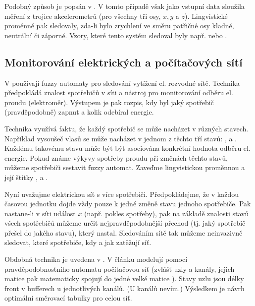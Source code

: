 \documentclass[a4paper,10pt]{article}
\begin{document}
Podobný způsob je popsán v \cite{Hul+-ManRecUsProFinStaMacFuzLog}. V tomto případě však jako vstupní data sloužila měření z trojice akcelerometrů (pro všechny tři osy, $x, y$ a $z$). Lingvistické proměnné pak sledovaly, zda-li bylo zrychlení ve směru patřičné osy kladné, neutrální či záporné. Vzory, které tento systém sledoval byly např.  nebo .


\subsection{Monitorování elektrických a počítačových sítí} \label{subs:MonElComNet}
V \cite{DucMarMar-AlgBasFiStMacFuzTrNoIntrLoaDis} používají fuzzy automaty pro sledování vytížení el. rozvodné sítě. Technika předpokládá znalost spotřebičů v síti a nástroj pro monitorování odběru el. proudu (elektroměr). Výstupem je pak rozpis, kdy byl jaký spotřebič (pravděpodobně) zapnut a kolik odebíral energie.

Technika využívá faktu, že každý spotřebič se může nacházet v různých stavech. Například vysoušeč vlasů se může nacházet v jednom z těchto tří stavů: ,  a . Každému takovému stavu může být být asociována konkrétní hodnota odběru el. energie.  Pokud známe výkyvy spotřeby proudu při změnách těchto stavů, můžeme spotřebiči sestavit fuzzy automat. Zaveďme lingvistickou proměnnou  a její štítky ,  a . 

Nyní uvažujme elektrickou síť s více spotřebiči. Předpokládejme, že v každou časovou jednotku dojde vždy pouze k jedné změně stavu jednoho spotřebiče. Pak nastane-li v síti událost $x$ (např. pokles spotřeby), pak na základě znalosti stavů všech spotřebičů můžeme určit nejpravděpodobnější přechod (tj. jaký spotřebič přešel do jakého stavu), který nastal. Sledováním sítě tak můžeme neinvazivně sledovat, které spotřebiče, kdy a jak zatěžují síť.


Obdobná technika je uvedena v \cite{Niz-ModComComNetViaPrAu}. V článku modelují pomocí pravděpodobnostního automatu počítačovou síť (zvlášť uzly a kanály, jejich matice pak matematicky spojují do jedné velké matice ). Stavy uzlu jsou délky front v bufferech u jednotlivých kanálů. (U kanálů nevím.) Výsledkem je návrh optimální směrovací tabulky pro celou síť. 
\end{document}
